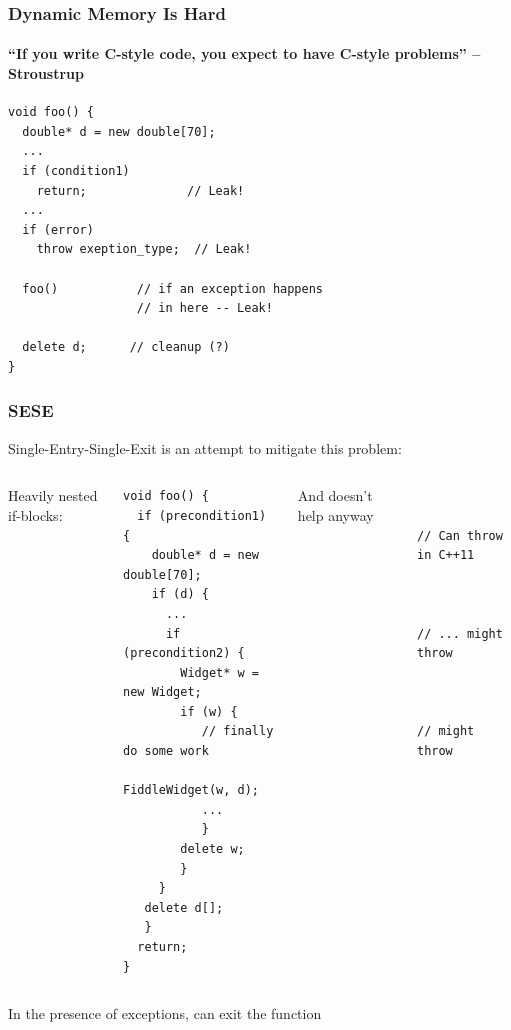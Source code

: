 
\begin{frame}[fragile,t]
\frametitle{Dynamic Memory Is Hard}
\framesubtitle{``If you write C-style code, you expect to have C-style problems'' -- Stroustrup}

{\scriptsize \begin{verbatim}
void foo() {
  double* d = new double[70];
  ...
  if (condition1)
    return;              // Leak!
  ...
  if (error)
    throw exeption_type;  // Leak!

  foo()           // if an exception happens
                  // in here -- Leak!

  delete d;      // cleanup (?)
}
\end{verbatim}}
\end{frame}




\begin{frame}[fragile,t]
\frametitle{SESE}

Single-Entry-Single-Exit is an attempt to mitigate this problem:
\vskip 6pt

\begin{columns}[t]
Heavily nested if-blocks:
{\scriptsize\begin{verbatim}
void foo() {
  if (precondition1) {
    double* d = new double[70];
    if (d) {
      ...
      if (precondition2) {
        Widget* w = new Widget;
        if (w) {
           // finally do some work
           FiddleWidget(w, d);
           ...
           }
        delete w;
        }
     }
   delete d[];
   }
  return;
}
\end{verbatim}}
\pause{}
And doesn't help anyway
{\scriptsize\begin{verbatim}


// Can throw in C++11



// ... might throw



// might throw






\end{verbatim}}
\end{columns}
\pause{}
\vskip 6pt
In the presence of exceptions,  can exit the function
\end{frame}



